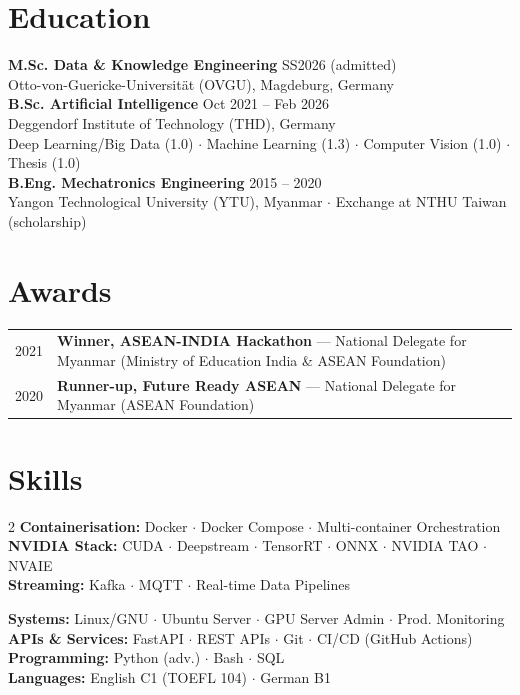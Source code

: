 \documentclass[10pt,a4paper]{article}
\begin{document}
\section{Education}
\small\noindent
{\bfseries M.Sc. Data \& Knowledge Engineering} \hfill {\color{lightgray} SS2026 (admitted)}\\[-2pt]
{\color{accent}Otto-von-Guericke-Universität (OVGU)}, Magdeburg, Germany\\[2pt]
{\bfseries B.Sc. Artificial Intelligence} \hfill {\color{lightgray} Oct 2021 -- Feb 2026}\\[-2pt]
{\color{accent}Deggendorf Institute of Technology (THD)}, Germany\\
Deep Learning/Big Data (1.0) $\cdot$ Machine Learning (1.3) $\cdot$ Computer Vision (1.0) $\cdot$ Thesis (1.0)\\[2pt]
{\bfseries B.Eng. Mechatronics Engineering} \hfill {\color{lightgray} 2015 -- 2020}\\[-2pt]
{\color{accent}Yangon Technological University (YTU)}, Myanmar $\cdot$ Exchange at NTHU Taiwan (scholarship)

\section{Awards}
\small\noindent
\begin{tabularx}{\textwidth}{@{}lX@{}}
2021 & \textbf{Winner, ASEAN-INDIA Hackathon} — National Delegate for Myanmar (Ministry of Education India \& ASEAN Foundation)\\[-1pt]
2020 & \textbf{Runner-up, Future Ready ASEAN} — National Delegate for Myanmar (ASEAN Foundation)\\
\end{tabularx}

\section{Skills}
\begin{multicols}{2}
\small\noindent
{\color{accent}\bfseries Containerisation:} Docker $\cdot$ Docker Compose $\cdot$ Multi-container Orchestration\\[1pt]
{\color{accent}\bfseries NVIDIA Stack:} CUDA $\cdot$ Deepstream $\cdot$ TensorRT $\cdot$ ONNX $\cdot$ NVIDIA TAO $\cdot$ NVAIE\\[1pt]
{\color{accent}\bfseries Streaming:} Kafka $\cdot$ MQTT $\cdot$ Real-time Data Pipelines

\columnbreak
{\color{accent}\bfseries Systems:} Linux/GNU $\cdot$ Ubuntu Server $\cdot$ GPU Server Admin $\cdot$ Prod. Monitoring\\[1pt]
{\color{accent}\bfseries APIs \& Services:} FastAPI $\cdot$ REST APIs $\cdot$ Git $\cdot$ CI/CD (GitHub Actions)\\[1pt]
{\color{accent}\bfseries Programming:} Python (adv.) $\cdot$ Bash $\cdot$ SQL\\[1pt]
{\color{accent}\bfseries Languages:} English C1 (TOEFL 104) $\cdot$ German B1
\end{multicols}
\end{document}
